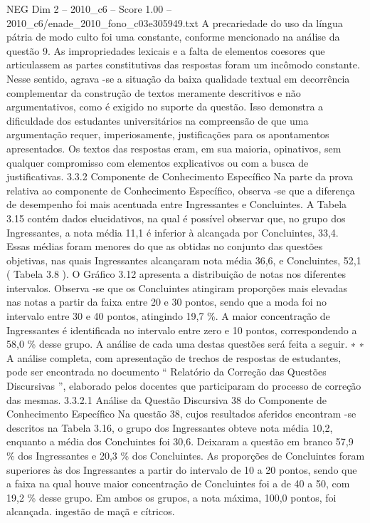 \begin{textsample}{NEG Dim 2 – 2010\_c6 – Score 1.00 – 2010\_c6/enade\_2010\_fono\_c03e305949.txt}
A precariedade do uso da língua pátria de modo culto foi uma constante, conforme mencionado na análise da questão 9.
As impropriedades lexicais e a falta de elementos coesores que articulassem as partes constitutivas das respostas foram um incômodo constante.
Nesse sentido, agrava -se a situação da baixa qualidade textual em decorrência complementar da construção de textos meramente descritivos e não argumentativos, como é exigido no suporte da questão.
Isso demonstra a dificuldade dos estudantes universitários na compreensão de que uma argumentação requer, imperiosamente, justificações para os apontamentos apresentados.
Os textos das respostas eram, em sua maioria, opinativos, sem qualquer compromisso com elementos explicativos ou com a busca de justificativas. 3.3.2 Componente de Conhecimento Específico Na parte da prova relativa ao componente de Conhecimento Específico, observa -se que a diferença de desempenho foi mais acentuada entre Ingressantes e Concluintes.
A Tabela 3.15 contém dados elucidativos, na qual é possível observar que, no grupo dos Ingressantes, a nota média 11,1 é inferior à alcançada por Concluintes, 33,4.
Essas médias foram menores do que as obtidas no conjunto das questões objetivas, nas quais Ingressantes alcançaram nota média 36,6, e Concluintes, 52,1 ( Tabela 3.8 ).
O Gráfico 3.12 apresenta a distribuição de notas nos diferentes intervalos.
Observa -se que os Concluintes atingiram proporções mais elevadas nas notas a partir da faixa entre 20 e 30 pontos, sendo que a moda foi no intervalo entre 30 e 40 pontos, atingindo 19,7 \%.
A maior concentração de Ingressantes é identificada no intervalo entre zero e 10 pontos, correspondendo a 58,0 \% desse grupo.
A análise de cada uma destas questões será feita a seguir. ∗ ∗ A análise completa, com apresentação de trechos de respostas de estudantes, pode ser encontrada no documento “ Relatório da Correção das Questões Discursivas ”, elaborado pelos docentes que participaram do processo de correção das mesmas. 3.3.2.1 Análise da Questão Discursiva 38 do Componente de Conhecimento Específico Na questão 38, cujos resultados aferidos encontram -se descritos na Tabela 3.16, o grupo dos Ingressantes obteve nota média 10,2, enquanto a média dos Concluintes foi 30,6.
Deixaram a questão em branco 57,9 \% dos Ingressantes e 20,3 \% dos Concluintes.
As proporções de Concluintes foram superiores às dos Ingressantes a partir do intervalo de 10 a 20 pontos, sendo que a faixa na qual houve maior concentração de Concluintes foi a de 40 a 50, com 19,2 \% desse grupo.
Em ambos os grupos, a nota máxima, 100,0 pontos, foi alcançada. ingestão de maçã e cítricos.

\end{textsample}
